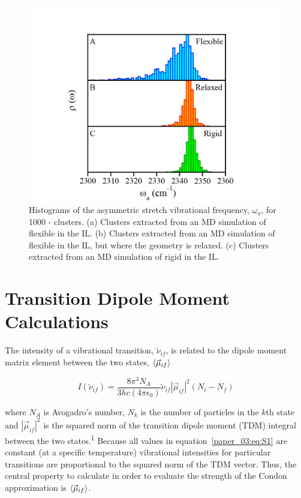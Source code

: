 \begin{figure}[h]
  \centering
  \includegraphics{paper_03/figure5.png}
  \caption{Histograms of the  asymmetric stretch vibrational frequency, \(\omega_{a}\), for \num{1000} -\ce{[C4C1im][PF6]} clusters. (a) Clusters extracted from an MD simulation of flexible  in the \ce{[C4C1im][PF6]} IL. (b) Clusters extracted from an MD simulation of flexible  in the \ce{[C4C1im][PF6]} IL, but where the  geometry is relaxed. (c) Clusters extracted from an MD simulation of rigid  in the \ce{[C4C1im][PF6]} IL.}
  \label{paper_03:fig5}
\end{figure}

\section{Transition Dipole Moment Calculations}
\label{paper_03:sec:SI}

The intensity of a vibrational transition, \(\tilde{\nu}_{if}\), is related to the dipole moment matrix element between the two states, \(\Braket{\vec{\mu}_{if}}\)

\begin{equation}
  \label{paper_03:eq:S1}
  I \left( \tilde{\nu}_{if} \right) = \frac{8\pi^{3}N_{A}}{3hc\left( 4\pi\epsilon_{0} \right)} \tilde{\nu}_{if} \left| \vec{\mu}_{if} \right|^{2} (N_{i} - N_{f})
\end{equation}

where \(N_{A}\) is Avogadro's number, \(N_{k}\) is the number of particles in the \(k\)th state and \(\left| \vec{\mu}_{if} \right|^{2}\) is the squared norm of the transition dipole moment (TDM) integral between the two states.\textsuperscript{1} Because all values in equation~\ref{paper_03:eq:S1} are constant (at a specific temperature) vibrational intensities for particular transitions are proportional to the squared norm of the TDM vector. Thus, the central property to calculate in order to evaluate the strength of the Condon approximation is \(\Braket{\vec{\mu}_{if}}\).


